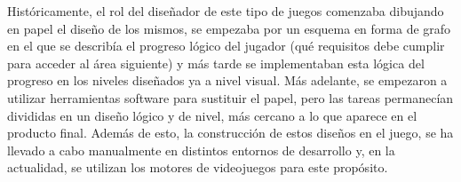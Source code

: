 Históricamente, el rol del diseñador de este tipo de juegos comenzaba dibujando en papel el diseño de los mismos, se empezaba por un esquema en forma de grafo en el que se describía el progreso lógico del jugador (qué requisitos debe cumplir para acceder al área siguiente) y más tarde se implementaban esta lógica del progreso en los niveles diseñados ya a nivel visual.
Más adelante, se empezaron a utilizar herramientas software para sustituir el papel, pero las tareas permanecían divididas en un diseño lógico y de nivel, más cercano a lo que aparece en el producto final.
Además de esto, la construcción de estos diseños en el juego, se ha llevado a cabo manualmente en distintos entornos de desarrollo y, en la actualidad, se utilizan los motores de videojuegos para este propósito.